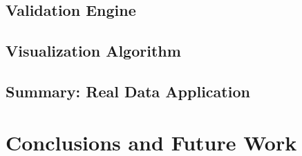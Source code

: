 \documentclass[11pt,a4paper, DIV=12]{report}
\begin{document}
    \section{Validation Engine}
        
        \label{section_evaluation_validation_engine}
    \section{Visualization Algorithm}
        
        \label{section_evaluation_visualization_algorithm}
    \section{Summary: Real Data Application}
        
        \label{section_evaluation_summary}
\chapter{Conclusions and Future Work}
    \label{section_conclusions}
    

\listoffigures
\listoftables
{}
%

\end{document}
